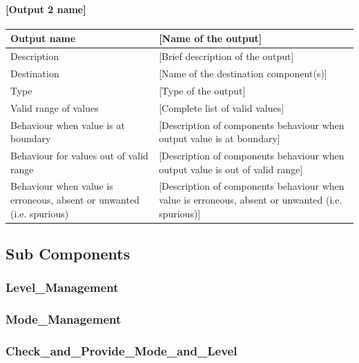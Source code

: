 \paragraph{[Output 2 name]}

\begin{longtable}{p{}p{}}
\toprule
Output name				& [Name of the output] \\
\midrule
Description				& [Brief description of the output] \\
\midrule
Destination				& [Name of the destination component(s)] \\ 
\midrule
Type					& [Type of the output] \\
\midrule
Valid range of values	& [Complete list of valid values] \\
\midrule
Behaviour when value is at boundary	& [Description of components behaviour when output value is at boundary] \\
\midrule
Behaviour for values out of valid range	& [Description of components behaviour when output value is out of valid range] \\
\midrule
Behaviour when value is erroneous, absent or unwanted (i.e. spurious) & [Description of components behaviour when value is erroneous, absent or unwanted (i.e. spurious)] \\
\bottomrule
\end{longtable}


\subsection{Sub Components}\label{s:mdoe_and_level_subcomponents}

\subsubsection{Level\_Management}


\subsubsection{Mode\_Management}


\subsubsection{Check\_and\_Provide\_Mode\_and\_Level}



